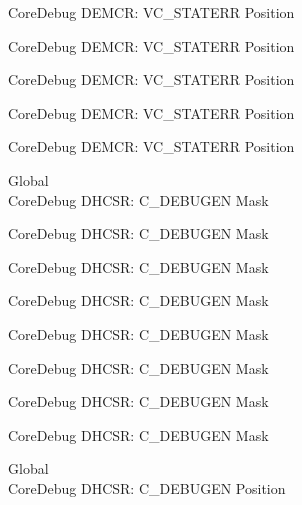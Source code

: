 \begin{DoxyRefList}
\label{deprecated__deprecated000205}%
%
Core\+Debug DEMCR\+: VC\+\_\+\+STATERR Position 

\label{deprecated__deprecated000347}%
%
Core\+Debug DEMCR\+: VC\+\_\+\+STATERR Position 

\label{deprecated__deprecated000423}%
%
Core\+Debug DEMCR\+: VC\+\_\+\+STATERR Position 

\label{deprecated__deprecated000512}%
%
Core\+Debug DEMCR\+: VC\+\_\+\+STATERR Position 

\label{deprecated__deprecated000614}%
%
Core\+Debug DEMCR\+: VC\+\_\+\+STATERR Position  
\item[Global \doxylink{group___c_m_s_i_s___core_debug_gab815c741a4fc2a61988cd2fb7594210b}{Core\+Debug\+\_\+\+DHCSR\+\_\+\+C\+\_\+\+DEBUGEN\+\_\+\+Msk} ]\hfill \\
\label{deprecated__deprecated000040}%
%
Core\+Debug DHCSR\+: C\+\_\+\+DEBUGEN Mask 

\label{deprecated__deprecated000128}%
%
Core\+Debug DHCSR\+: C\+\_\+\+DEBUGEN Mask 

\label{deprecated__deprecated000184}%
%
Core\+Debug DHCSR\+: C\+\_\+\+DEBUGEN Mask 

\label{deprecated__deprecated000267}%
%
Core\+Debug DHCSR\+: C\+\_\+\+DEBUGEN Mask 

\label{deprecated__deprecated000326}%
%
Core\+Debug DHCSR\+: C\+\_\+\+DEBUGEN Mask 

\label{deprecated__deprecated000402}%
%
Core\+Debug DHCSR\+: C\+\_\+\+DEBUGEN Mask 

\label{deprecated__deprecated000491}%
%
Core\+Debug DHCSR\+: C\+\_\+\+DEBUGEN Mask 

\label{deprecated__deprecated000593}%
%
Core\+Debug DHCSR\+: C\+\_\+\+DEBUGEN Mask  
\item[Global \doxylink{group___c_m_s_i_s___core_debug_gab557abb5b172b74d2cf44efb9d824e4e}{Core\+Debug\+\_\+\+DHCSR\+\_\+\+C\+\_\+\+DEBUGEN\+\_\+\+Pos} ]\hfill \\
\label{deprecated__deprecated000039}%
%
Core\+Debug DHCSR\+: C\+\_\+\+DEBUGEN Position 


\end{DoxyRefList}
